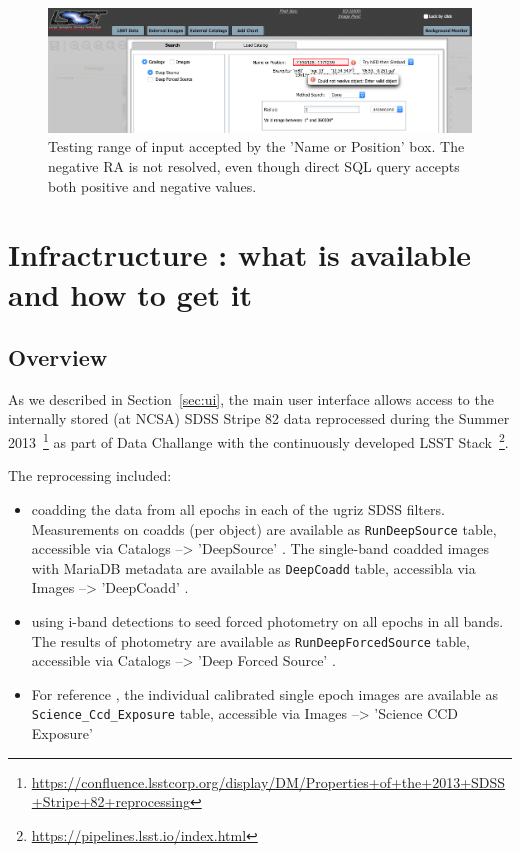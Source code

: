 \documentclass[DM,lsstdraft,toc]{lsstdoc}
\begin{document}
\begin{figure}
\includegraphics[width = \textwidth]{figs/1_PDAC_interface_a}
\caption{Testing range of input accepted by the 'Name or Position' box. The negative RA is not resolved, even though direct SQL query accepts both positive and negative values.}
\label{fig:PDAC_test1}
\end{figure}




\section{Infractructure : what is available and how to get it }
\label{sec:infra}
\subsection{Overview}


As we described in Section~\ref{sec:ui}, the main user interface allows access to the internally stored (at NCSA) SDSS Stripe 82 data reprocessed during the Summer 2013~\footnote{\url{https://confluence.lsstcorp.org/display/DM/Properties+of+the+2013+SDSS+Stripe+82+reprocessing}} as part of Data Challange with the continuously developed LSST Stack~\footnote{\url{https://pipelines.lsst.io/index.html}}.

The reprocessing included:
\begin{itemize}
\item coadding the data from all epochs in each of the ugriz SDSS filters. Measurements on coadds (per object) are available as  \verb|RunDeepSource| table, accessible via Catalogs -->   'DeepSource' .  The single-band coadded images with MariaDB metadata are available as \verb|DeepCoadd| table, accessibla via Images -->  'DeepCoadd' .
\item using i-band detections to seed forced photometry on all epochs in all bands. The results of photometry are available as \verb|RunDeepForcedSource| table, accessible via  Catalogs --> 'Deep Forced Source' .
\item For reference , the individual calibrated single epoch images are available as \verb|Science_Ccd_Exposure| table, accessible via Images --> 'Science CCD Exposure'
\end{itemize}
\end{document}

